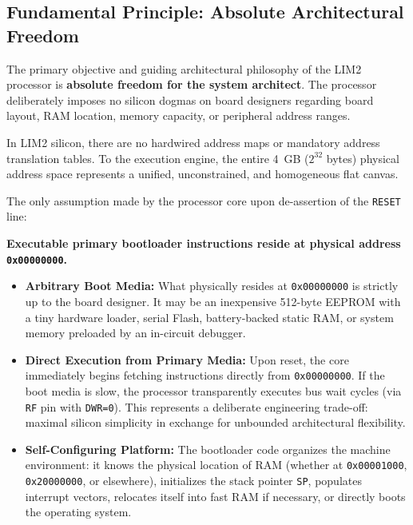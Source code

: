 \documentclass[11pt,a4paper]{article}
\begin{document}
\subsection{Fundamental Principle: Absolute Architectural Freedom}
The primary objective and guiding architectural philosophy of the LIM2 processor is \textbf{absolute freedom for the system architect}. The processor deliberately imposes no silicon dogmas on board designers regarding board layout, RAM location, memory capacity, or peripheral address ranges.

In LIM2 silicon, there are no hardwired address maps or mandatory address translation tables. To the execution engine, the entire 4~GB ($2^{32}$ bytes) physical address space represents a unified, unconstrained, and homogeneous flat canvas.

\begin{archcallout}[title={The Sole Hardware Boot Axiom: Entry Point 0x00000000},top=4pt,bottom=4pt]
The only assumption made by the processor core upon de-assertion of the \texttt{RESET} line:
\begin{center}
\textbf{Executable primary bootloader instructions reside at physical address \texttt{0x00000000}.}
\end{center}
\begin{itemize}[leftmargin=10pt,itemsep=1pt,topsep=1pt,parsep=0pt]
    \item \textbf{Arbitrary Boot Media:} What physically resides at \texttt{0x00000000} is strictly up to the board designer. It may be an inexpensive 512-byte EEPROM with a tiny hardware loader, serial Flash, battery-backed static RAM, or system memory preloaded by an in-circuit debugger.
    \item \textbf{Direct Execution from Primary Media:} Upon reset, the core immediately begins fetching instructions directly from \texttt{0x00000000}. If the boot media is slow, the processor transparently executes bus wait cycles (via \texttt{RF} pin with \texttt{DWR=0}). This represents a deliberate engineering trade-off: maximal silicon simplicity in exchange for unbounded architectural flexibility.
    \item \textbf{Self-Configuring Platform:} The bootloader code organizes the machine environment: it knows the physical location of RAM (whether at \texttt{0x00001000}, \texttt{0x20000000}, or elsewhere), initializes the stack pointer \texttt{SP}, populates interrupt vectors, relocates itself into fast RAM if necessary, or directly boots the operating system.
\end{itemize}
\end{archcallout}
\end{document}
